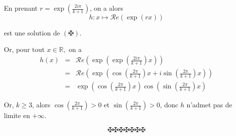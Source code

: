 En prenant $r = \exp \left( \frac{2 i \pi}{k + 1} \right)$, on a alors
\[ h : x \longmapsto \mathcal{R}e (\exp (r x)) \]


est une solution de $(\maltese) .$

Or, pour tout $x \in \mathbb{R},$ on a
\begin{eqnarray*}
  h (x) & = & \mathcal{R}e \left( \exp \left( \exp \left( \frac{2 i \pi}{k +
  1} \right) x \right) \right)\\
  & = & \mathcal{R}e \left( \exp \left( \cos \left( \frac{2 \pi}{k + 1}
  \right) x + i \sin \left( \frac{2 \pi}{k + 1} \right) x \right) \right)\\
  & = & \exp \left( \cos \left( \frac{2 \pi}{k + 1} \right) x \right) \cos
  \left( \sin \left( \frac{2 \pi}{k + 1} \right) x \right)
\end{eqnarray*}


Or, $k \geqslant 3$, alors $\cos \left( \frac{2 \pi}{k + 1} \right) > 0$ et
$\sin \left( \frac{2 \pi}{k + 1} \right) > 0$, donc $h$ n'admet pas de limite
en $+ \infty$.


\[ \maltese \maltese \maltese \maltese \maltese \maltese \maltese \]
